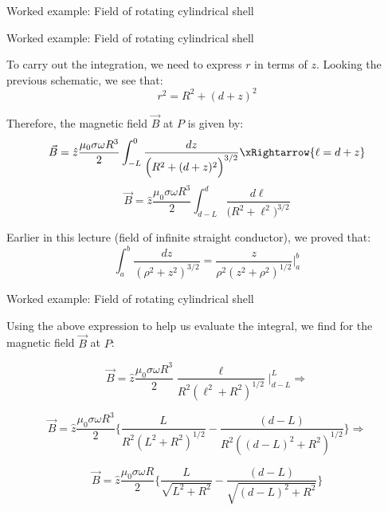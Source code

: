 {\begin{frame}{Worked example: Field of rotating cylindrical shell}
\end{frame}

%
%
%

\begin{frame}{Worked example: Field of rotating cylindrical shell}

To carry out the integration, we need to express $r$ in terms of $z$.
Looking the previous schematic, we see that:
\begin{equation*}
  r^2 = R^2 + (d+z)^2
\end{equation*}

Therefore, the magnetic field $\vec{B}$ at $P$ is given by:
\begin{equation*}
  \vec{B} =
    \hat{z} \frac{\mu_0 \sigma \omega R^3}{2}
    \int_{-L}^{0} \frac{dz}{\Big( R^2 + (d+z)^2 \Big)^{3/2}} \xRightarrow{\ell = d+z}
\end{equation*}
\begin{equation*}
  \vec{B} =
  \hat{z} \frac{\mu_0 \sigma \omega R^3}{2}
  \int_{d-L}^{d} \frac{d\ell}{\Big( R^2 + \ell^2 \Big)^{3/2}}
\end{equation*}

Earlier in this lecture (field of infinite straight conductor), we proved that:
\begin{equation*}
  \int_{a}^{b} \frac{dz}{({\rho}^2+z^2)^{3/2}} = \frac{z}{{\rho}^{2}(z^{2}+{\rho}^{2})^{1/2}} \biggr\rvert_{a}^{b}
\end{equation*}

\end{frame}

%
%
%

\begin{frame}{Worked example: Field of rotating cylindrical shell}

Using the above expression to help us evaluate the integral,
we find for the magnetic field $\vec{B}$ at $P$:

\begin{equation*}
  \vec{B} =
  \hat{z} \frac{\mu_0 \sigma \omega R^3}{2}
  \frac{\ell}{R^{2}({\ell}^{2}+R^{2})^{1/2}} \biggr\rvert_{d-L}^{L} \Rightarrow
\end{equation*}

\begin{equation*}
  \vec{B} =
  \hat{z} \frac{\mu_0 \sigma \omega R^3}{2}
  \Big\{
  \frac{L}{R^{2}(L^{2}+R^{2})^{1/2}} -
  \frac{(d-L)}{R^{2}((d-L)^{2}+R^{2})^{1/2}}
  \Big\} \Rightarrow
\end{equation*}

\begin{equation*}
  \vec{B} =
  \hat{z} \frac{\mu_0 \sigma \omega R}{2}
  \Big\{
  \frac{L}{\sqrt{L^{2}+R^{2}}} -
  \frac{(d-L)}{\sqrt{(d-L)^{2}+R^{2}}}
  \Big\}
\end{equation*}


\end{frame}}
